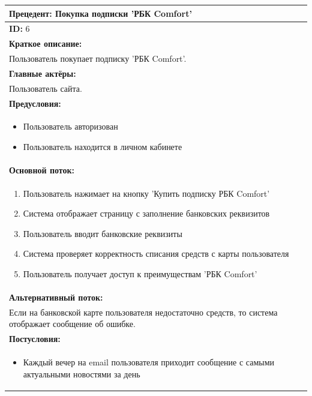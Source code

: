 \documentclass{scrreprt}
\begin{document}
\vspace{10px}
\noindent
\begin{tabularx}{\textwidth}{|X|}
	\hline
	\textbf{Прецедент: Покупка подписки 'РБК Comfort'} \\
	\hline
	\textbf{ID:} 6 \\
	\hline
	\textbf{Краткое описание:} \\
	Пользователь покупает подписку 'РБК Comfort'. \\
	\hline
	\textbf{Главные актёры:} \\
	Пользователь сайта. \\
	\hline
	\textbf{Предусловия:} \\
	\begin{itemize}[nosep,leftmargin=*]
		\item Пользователь авторизован 
		\item Пользователь находится в личном кабинете 
	\end{itemize} \\
	\hline
	\textbf{Основной поток:} \\
	\begin{enumerate}[nosep,leftmargin=*]
		\item Пользователь нажимает на кнопку 'Купить подписку РБК Comfort'
		\item Система отображает страницу с заполнение банковских реквизитов
		\item Пользователь вводит банковские реквизиты
		\item Система проверяет корректность списания средств с карты пользователя
		\item Пользователь получает доступ к преимуществам 'РБК Comfort'
	\end{enumerate} \\
	\hline
	\textbf{Альтернативный поток:} \\
	Если на банковской карте пользователя недостаточно средств, то система отображает сообщение об ошибке.\\
	\hline
	\textbf{Постусловия:} \\
	\begin{itemize}[nosep,leftmargin=*]
		\item Каждый вечер на email пользователя приходит сообщение с самыми актуальными новостями за день
	\end{itemize} \\
	\hline
\end{tabularx}
\end{document}
